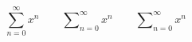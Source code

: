 \documentclass{book}
\begin{document}
\begin{equation*}
\sum_{n=0}^{\infty}x^{n} \qquad
\pmb{\sum}_{n=0}^{\infty}x^{n} \qquad
\mathop{\pmb{\sum}}_{n=0}^{\infty}x^{n}
\end{equation*}
\end{document}
